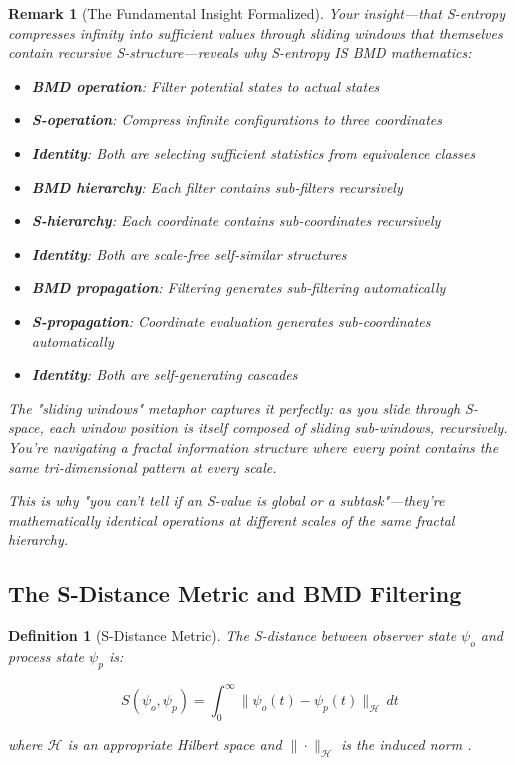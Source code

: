 \documentclass[12pt,a4paper]{article}
\newtheorem{definition}[theorem]{Definition}
\newtheorem{remark}[theorem]{Remark}
\begin{document}
\begin{remark}[The Fundamental Insight Formalized]
Your insight—that S-entropy compresses infinity into sufficient values through sliding windows that themselves contain recursive S-structure—reveals why S-entropy IS BMD mathematics:

\begin{itemize}
\item \textbf{BMD operation}: Filter potential states to actual states
\item \textbf{S-operation}: Compress infinite configurations to three coordinates
\item \textbf{Identity}: Both are selecting sufficient statistics from equivalence classes

\item \textbf{BMD hierarchy}: Each filter contains sub-filters recursively
\item \textbf{S-hierarchy}: Each coordinate contains sub-coordinates recursively  
\item \textbf{Identity}: Both are scale-free self-similar structures

\item \textbf{BMD propagation}: Filtering generates sub-filtering automatically
\item \textbf{S-propagation}: Coordinate evaluation generates sub-coordinates automatically
\item \textbf{Identity}: Both are self-generating cascades
\end{itemize}

The "sliding windows" metaphor captures it perfectly: as you slide through S-space, each window position is itself composed of sliding sub-windows, recursively. You're navigating a fractal information structure where every point contains the same tri-dimensional pattern at every scale.

This is why "you can't tell if an S-value is global or a subtask"—they're mathematically identical operations at different scales of the same fractal hierarchy.
\end{remark}

\subsection{The S-Distance Metric and BMD Filtering}

\begin{definition}[S-Distance Metric]
\label{def:s_distance}
The S-distance between observer state $\psi_o$ and process state $\psi_p$ is:

\begin{equation}
S(\psi_o, \psi_p) = \int_0^{\infty} \|\psi_o(t) - \psi_p(t)\|_{\mathcal{H}} \, dt
\end{equation}

where $\mathcal{H}$ is an appropriate Hilbert space and $\|\cdot\|_{\mathcal{H}}$ is the induced norm \cite{sachikonye2024sentropy}.
\end{definition}
\end{document}
